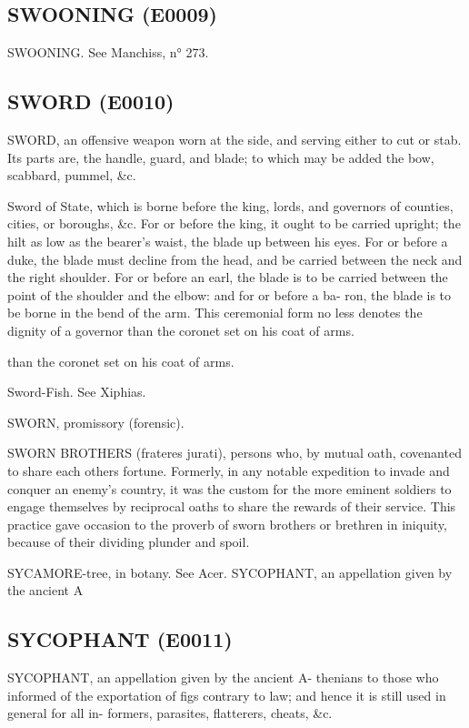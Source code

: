 \documentclass{article}
\begin{document}
\subsection*{SWOONING (E0009)}
SWOONING. See Manchiss, n° 273.

\subsection*{SWORD (E0010)}
SWORD, an offensive weapon worn at the side, and serving either to cut or stab. Its parts are, the handle, guard, and blade; to which may be added the bow, scabbard, pummel, \&c.

Sword of State, which is borne before the king, lords,
and governors of counties, cities, or boroughs, \&c. For
or before the king, it ought to be carried upright; the hilt
as low as the bearer's waist, the blade up between his eyes.
For or before a duke, the blade must decline from the head,
and be carried between the neck and the right shoulder.
For or before an earl, the blade is to be carried between the
point of the shoulder and the elbow: and for or before a ba-
ron, the blade is to be borne in the bend of the arm. This
ceremonial form no less denotes the dignity of a governor
than the coronet set on his coat of arms.

than the coronet set on his coat of arms.

Sword-Fish. See Xiphias.

SWORN, promissory (forensic).

SWORN BROTHERS (frateres jurati), persons who, by mutual oath, covenanted to share each others fortune. Formerly, in any notable expedition to invade and conquer an enemy's country, it was the custom for the more eminent soldiers to engage themselves by reciprocal oaths to share the rewards of their service. This practice gave occasion to the proverb of sworn brothers or brethren in iniquity, because of their dividing plunder and spoil.

SYCAMORE-tree, in botany. See Acer.
SYCOPHANT, an appellation given by the ancient A

\subsection*{SYCOPHANT (E0011)}
SYCOPHANT, an appellation given by the ancient A-
thenians to those who informed of the exportation of figs
contrary to law; and hence it is still used in general for all in-
formers, parasites, flatterers, cheats, \&c.
\end{document}
